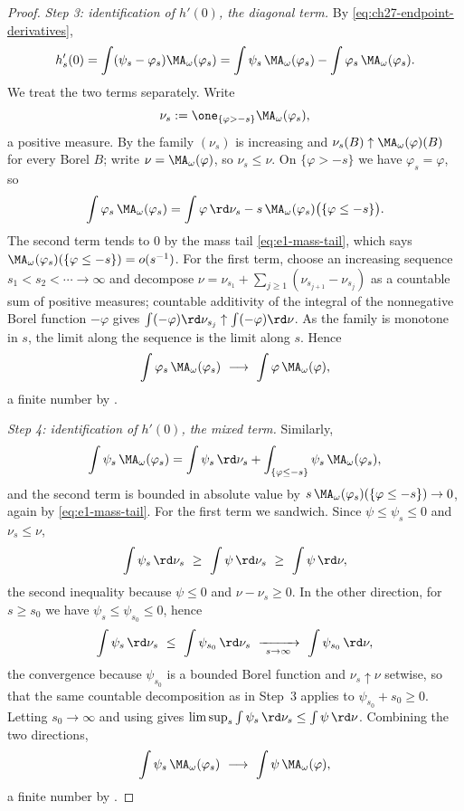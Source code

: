 \begin{proof}
\emph{Step 3: identification of \(h'(0)\), the diagonal term.}
By \eqref{eq:ch27-endpoint-derivatives},
\[
 h_s'(0)=\int(\psi_s-\varphi_s)\MA_\omega(\varphi_s)
 =\int\psi_s\,\MA_\omega(\varphi_s)-\int\varphi_s\,\MA_\omega(\varphi_s).
\]
We treat the two terms separately.  Write
\[
 \nu_s:=\one_{\{\varphi>-s\}}\MA_\omega(\varphi_s),
\]
a positive measure.  By  the family
\((\nu_s)\) is increasing and \(\nu_s(B)\uparrow\MA_\omega(\varphi)(B)\) for
every Borel \(B\); write \(\nu=\MA_\omega(\varphi)\), so \(\nu_s\leq\nu\).
On \(\{\varphi>-s\}\) we have \(\varphi_s=\varphi\), so
\[
 \int\varphi_s\,\MA_\omega(\varphi_s)
 =\int\varphi\,\rd\nu_s
   -s\,\MA_\omega(\varphi_s)\bigl(\{\varphi\leq-s\}\bigr).
\]
The second term tends to \(0\) by the mass tail \eqref{eq:e1-mass-tail},
which says \(\MA_\omega(\varphi_s)(\{\varphi\leq-s\})=o(s^{-1})\).  For the
first term, choose an increasing sequence \(s_1<s_2<\cdots\to\infty\) and
decompose
\(\nu=\nu_{s_1}+\sum_{j\geq1}(\nu_{s_{j+1}}-\nu_{s_j})\) as a countable sum
of positive measures; countable additivity of the integral of the
nonnegative Borel function \(-\varphi\) gives
\(\int(-\varphi)\rd\nu_{s_j}\uparrow\int(-\varphi)\rd\nu\).  As the family
is monotone in \(s\), the limit along the sequence is the limit along \(s\).
Hence
\begin{equation}\label{eq:ch27-diagonal-limit}
 \int\varphi_s\,\MA_\omega(\varphi_s)
 \ \longrightarrow\ \int\varphi\,\MA_\omega(\varphi),
\end{equation}
a finite number by .

\emph{Step 4: identification of \(h'(0)\), the mixed term.}
Similarly,
\[
 \int\psi_s\,\MA_\omega(\varphi_s)
 =\int\psi_s\,\rd\nu_s
  +\int_{\{\varphi\leq-s\}}\psi_s\,\MA_\omega(\varphi_s),
\]
and the second term is bounded in absolute value by
\(s\,\MA_\omega(\varphi_s)(\{\varphi\leq-s\})\to0\), again by
\eqref{eq:e1-mass-tail}.  For the first term we sandwich.  Since
\(\psi\leq\psi_s\leq0\) and \(\nu_s\leq\nu\),
\[
 \int\psi_s\,\rd\nu_s\ \geq\ \int\psi\,\rd\nu_s\ \geq\ \int\psi\,\rd\nu ,
\]
the second inequality because \(\psi\leq0\) and \(\nu-\nu_s\geq0\).  In the
other direction, for \(s\geq s_0\) we have \(\psi_s\leq\psi_{s_0}\leq0\),
hence
\[
 \int\psi_s\,\rd\nu_s\ \leq\ \int\psi_{s_0}\,\rd\nu_s
 \ \xrightarrow[\ s\to\infty\ ]{}\ \int\psi_{s_0}\,\rd\nu ,
\]
the convergence because \(\psi_{s_0}\) is a bounded Borel function and
\(\nu_s\uparrow\nu\) setwise, so that the same countable decomposition as in
Step~3 applies to \(\psi_{s_0}+s_0\geq0\).  Letting \(s_0\to\infty\) and
using  gives
\(\limsup_s\int\psi_s\,\rd\nu_s\leq\int\psi\,\rd\nu\).  Combining the two
directions,
\begin{equation}\label{eq:ch27-mixed-limit}
 \int\psi_s\,\MA_\omega(\varphi_s)
 \ \longrightarrow\ \int\psi\,\MA_\omega(\varphi),
\end{equation}
a finite number by .


\end{proof}
